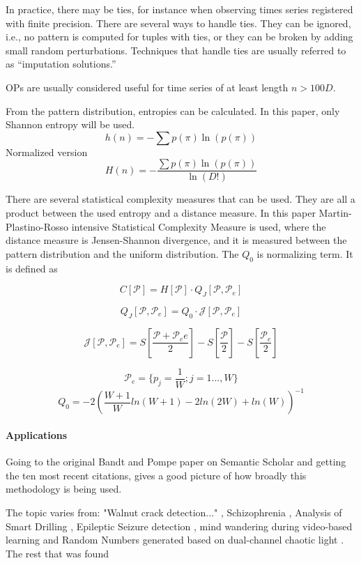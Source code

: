 In practice, there may be ties, for instance when observing times series registered with finite precision.
There are several ways to handle ties.
They can be ignored, i.e., no pattern is computed for tuples with ties,
or they can be broken by adding small random perturbations. 
Techniques that handle ties are usually referred to as ``imputation solutions.''

OPs are usually considered useful for time series of at least length $n>100D$.


From the pattern distribution, entropies can be calculated. In this paper, only Shannon entropy will be used. 
$$h(n)=-\sum p(\pi) \ln(p(\pi))$$
Normalized version
$$H(n)=-\frac{\sum p(\pi) \ln(p(\pi))}{\ln(D!)}$$

There are several statistical complexity measures that can be used. They are all a product between the used entropy and a distance measure. In this paper Martin-Plastino-Rosso intensive Statistical Complexity Measure is used, where the distance measure is Jensen-Shannon divergence, and it is measured between the pattern distribution and the uniform distribution. The $Q_0$ is normalizing term. It is defined as

$$C[\mathscr{P}]=H[\mathscr{P}]\cdot Q_J[\mathscr{P},\mathscr{P}_e]$$

$$Q_J[\mathscr{P},\mathscr{P}_e]=Q_0\cdot \mathscr{J}[\mathscr{P},\mathscr{P}_e]$$

$$\mathscr{J}[\mathscr{P},\mathscr{P}_e]=S[\frac{\mathscr{P}+\mathscr{P}_ee}{2}]-S[\frac{\mathscr{P}}{2}]-S[\frac{\mathscr{P}_e}{2}]$$

$$\mathscr{P}_e=\{p_j=\frac{1}{W};j=1...,W\}$$
$$Q_0 = -2(\frac{W+1}{W}ln(W+1)-2ln(2W)+ln(W))^{-1}$$
\cite{Amigo2023b}

\paragraph{Applications}
Going to the original Bandt and Pompe paper \cite{Bandt2002} on Semantic Scholar and getting the ten most recent citations, gives a good picture of how broadly this methodology is being used.

The topic varies from: "Walnut crack detection..." \cite{Zhang2024}, Schizophrenia \cite{Wang2024}, Analysis of Smart Drilling \cite{Szwajka2024}, Epileptic Seizure detection \cite{AbhishekParikh2024}, mind wandering during video-based learning \cite{Tang2024} and Random Numbers generated based on dual-channel chaotic light \cite{Liu2024}. The rest that was found \cite{Demirel2024, Du2024, Sun2024, Li2024}

